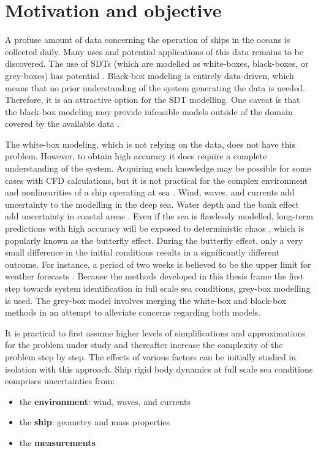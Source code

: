 \section{Motivation and objective}
\label{sec:motivation}
A profuse amount of data concerning the operation of ships in the oceans is collected daily. Many uses and potential applications of this data remains to be discovered. The use of SDTs (which are modelled as white-boxes, black-boxes, or grey-boxes) has potential .
Black-box modeling is entirely data-driven, which means that no prior understanding of the system generating the data is needed. Therefore, it is an attractive option for the SDT modelling. One caveat is that the black-box modeling may provide infeasible models outside of the domain covered by the available data \cite{nielsen_machine_2022}. 

The white-box modeling, which is not relying on the data, does not have this problem. However, to obtain high accuracy it does require a complete understanding of the system. Acquiring such knowledge may be possible for some cases with CFD calculations, but it is not practical for the complex environment and nonlinearities of a ship operating at sea \cite{miller_ship_2021}. 
Wind, waves, and currents add uncertainty to the modelling in the deep sea. Water depth and the bank effect add uncertainty in coastal areas \cite{nielsen_machine_2022}. 
Even if the sea is flawlessly modelled, long-term predictions with high accuracy will be exposed to deterministic chaos \cite{lorenz_deterministic_1963}, which is popularly known as the butterfly effect. During the butterfly effect, only a very small difference in the initial conditions results in a significantly different outcome. For instance, a period of two weeks is believed to be the upper limit for weather forecasts  \cite{zhang_what_2019}. Because the methods developed in this thesis frame the first step towards system identification in full scale sea conditions, grey-box modelling is used. The grey-box model involves merging the white-box and black-box methods in an attempt to alleviate concerns regarding both models. 

It is practical to first assume higher levels of simplifications and approximations for the problem under study and thereafter increase the complexity of the problem step by step. The effects of various factors can be initially studied in isolation with this approach. 
Ship rigid body dynamics at full scale sea conditions comprises uncertainties from:
\begin{itemize}
    \item the \textbf{environment}: wind, waves, and currents
    \item the \textbf{ship}: geometry and mass properties
    \item the \textbf{measurements}
\end{itemize}

